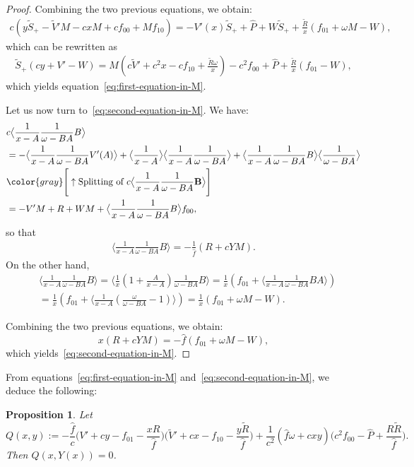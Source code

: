 \documentclass{scrartcl}
\newcommand{\gr}[1]{{\color{gray} #1}}
\newcommand\brak[1]{\big \langle #1 \big\rangle}
\newtheorem{prop}[thm]{Proposition}
\begin{document}
\begin{proof}
Combining the two previous equations, we obtain:
\begin{align*}
    c\left(y\widetilde{S}_+ - \widetilde{V}'M - cxM + cf_{00} + Mf_{10}\right) = -V'(x)\widetilde{S}_++\widehat{P}+W\widetilde{S}_++\frac{\widetilde{R}}{x}\left(f_{01} + \omega M - W\right),
\end{align*}
which can be rewritten as
\begin{align*}
    \widetilde{S}_+(cy + V' - W) = M\left(c\widetilde{V}'+c^2x-cf_{10}+\frac{\widetilde{R}\omega}{x}\right) - c^2f_{00} + \widehat{P} + \frac{\widetilde{R}}{x}(f_{01}-W),
\end{align*}
which yields equation~\eqref{eq:first-equation-in-M}. 

Let us now turn to~\eqref{eq:second-equation-in-M}. We have:
\begin{align*}
&c\brak{\frac{1}{x-A}\frac{1}{\omega-BA}B} \\
&= -\brak{\frac{1}{x-A}\frac{1}{\omega-BA}V'(A)} + \brak{\frac{1}{x-A}}\brak{\frac{1}{x-A}\frac{1}{\omega-BA}} + \brak{\frac{1}{x-A}\frac{1}{\omega-BA}B}\brak{\frac{1}{\omega-BA}}\\
&\gr{\Bigg[\uparrow\textnormal{Splitting of } c\brak{\frac{1}{x-A}\frac{1}{\omega-BA}\mathbf{B}}\Bigg]}\\
&=- V'M + R + WM +\brak{\frac{1}{x-A}\frac{1}{\omega-BA}B}f_{00},
\end{align*}
so that
\begin{align*}
    \brak{\frac{1}{x-A}\frac{1}{\omega-BA}B} = -\frac{1}{\widehat{f}}(R+cYM).
\end{align*}
On the other hand,
\begin{align*}
    &\brak{\frac{1}{x-A}\frac{1}{\omega-BA}B} = \brak{\frac{1}{x}\left(1+\frac{A}{x-A}\right)\frac{1}{\omega-BA}B} = \frac{1}{x}\left(f_{01} + \brak{\frac{1}{x-A}\frac{1}{\omega-BA}BA}\right) \\
    &= \frac{1}{x}\left(f_{01} + \brak{\frac{1}{x-A}\left(\frac{\omega}{\omega-BA}-1\right)}\right)= \frac{1}{x}\left(f_{01}+\omega M - W\right).
\end{align*}

Combining the two previous equations, we obtain:
\begin{equation*}
    x(R + cYM) = -\widehat{f}(f_{01}+\omega M - W),
\end{equation*}
which yields~\eqref{eq:second-equation-in-M}.

\end{proof}

From equations~\eqref{eq:first-equation-in-M} and~\eqref{eq:second-equation-in-M}, we deduce the following:
\begin{prop}
Let 
\begin{equation}
Q(x,y) :=-\frac{\widehat{f}}{c}\Big(V'+cy -f_{01}-\frac{xR}{\widehat{f}}\Big)\Big(\widetilde{V}'+cx -f_{10}-\frac{y\widetilde{R}}{\widehat{f}}\Big)+ \frac{1}{c^2}(\widehat{f}\omega +cxy)\big(c^2f_{00}-\widehat{P} + \frac{R\widetilde{R}}{\widehat{f}}\big).
\label{eq:Q}
\end{equation}
Then $Q(x,Y(x))=0$.
\label{prop:Q=0}
\end{prop}
\end{document}
